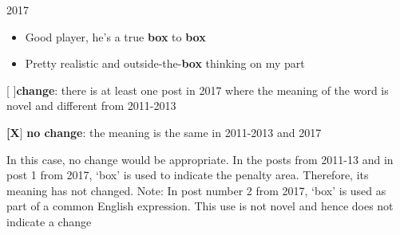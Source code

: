 \documentclass[11pt,a4paper]{article}
\begin{document}
\begin{minipage}{15cm}
\vspace*{0.25cm}

2017
\begin{itemize}
\item Good player, he’s a true \textbf{box} to \textbf{box}
\item Pretty realistic and outside-the-\textbf{box} thinking on my part
\end{itemize}

\vspace*{0.25cm}

[  ]\textbf{change}: there is at least one post in 2017 where the meaning of the word is novel and different from 2011-2013

\textbf{[X}] \textbf{no change}: the meaning is the same in 2011-2013 and 2017

\vspace*{0.25cm}

In this case, no change would be appropriate. In the posts from 2011-13 and in post 1 from 2017, `box' is used to indicate the penalty area. Therefore, its meaning has not changed. Note: In post number 2 from 2017, `box' is used as part of a common English expression. This use is not novel and hence does not indicate a change
\end{minipage}

\pagebreak

\clearpage

\end{document}
